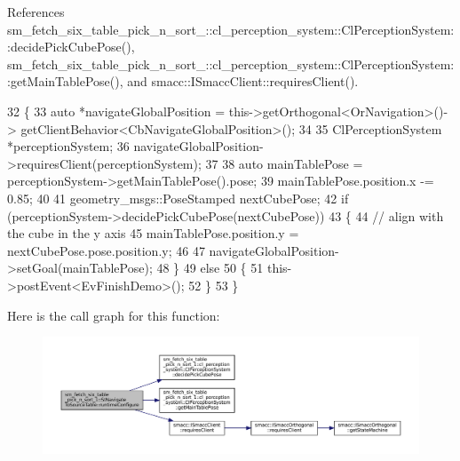 References sm\+\_\+fetch\+\_\+six\+\_\+table\+\_\+pick\+\_\+n\+\_\+sort\+\_\+::cl\+\_\+perception\+\_\+system\+::\+Cl\+Perception\+System\+::decide\+Pick\+Cube\+Pose(), sm\+\_\+fetch\+\_\+six\+\_\+table\+\_\+pick\+\_\+n\+\_\+sort\+\_\+::cl\+\_\+perception\+\_\+system\+::\+Cl\+Perception\+System\+::get\+Main\+Table\+Pose(), and smacc\+::\+I\+Smacc\+Client\+::requires\+Client().


\begin{DoxyCode}
32         \{
33             \textcolor{keyword}{auto} *navigateGlobalPosition = this->getOrthogonal<OrNavigation>()->
      getClientBehavior<CbNavigateGlobalPosition>();
34 
35             ClPerceptionSystem *perceptionSystem;
36             navigateGlobalPosition->requiresClient(perceptionSystem);
37 
38             \textcolor{keyword}{auto} mainTablePose = perceptionSystem->getMainTablePose().pose;
39             mainTablePose.position.x -= 0.85;
40 
41             geometry\_msgs::PoseStamped nextCubePose;
42             \textcolor{keywordflow}{if} (perceptionSystem->decidePickCubePose(nextCubePose))
43             \{
44                 \textcolor{comment}{// align with the cube in the y axis}
45                 mainTablePose.position.y = nextCubePose.pose.position.y;
46 
47                 navigateGlobalPosition->setGoal(mainTablePose);
48             \}
49             \textcolor{keywordflow}{else}
50             \{
51                 this->postEvent<EvFinishDemo>();
52             \}
53         \}
\end{DoxyCode}
Here is the call graph for this function\+:
\nopagebreak
\begin{figure}[H]
\begin{center}
\leavevmode
\includegraphics[width=350pt]{structsm__fetch__six__table__pick__n__sort__1_1_1StNavigateToSourceTable_a1e4b8cd70fbb88d5c42ebfdc48a9122f_cgraph}
\end{center}
\end{figure}
\mbox{\label{structsm__fetch__six__table__pick__n__sort__1_1_1StNavigateToSourceTable_a836a8ec737b708629633afb0655b3920}} 
